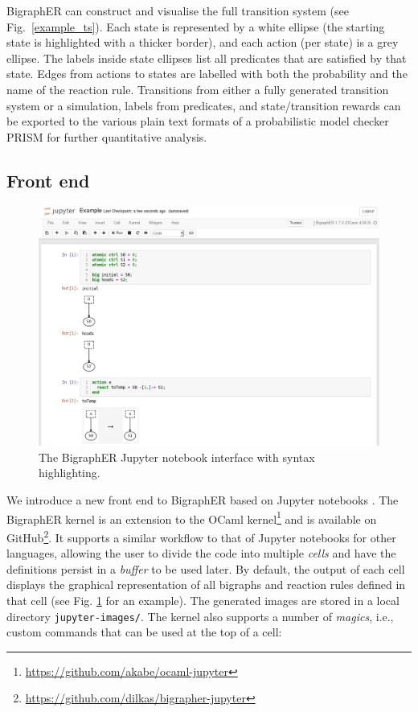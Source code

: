 \documentclass[runningheads]{llncs}
\begin{document}
BigraphER can construct and visualise the full transition system (see
Fig.~\ref{example_ts}). Each state is represented by a white ellipse (the
starting state is highlighted with a thicker border), and each action (per
state) is a grey ellipse. The labels inside state ellipses list all predicates
that are satisfied by that state. Edges from actions to states are labelled with
both the probability and the name of the reaction rule. Transitions from either
a fully generated transition system or a simulation, labels from predicates, and
state/transition rewards can be exported to the various plain text formats of a
probabilistic model checker PRISM \cite{DBLP:conf/cav/KwiatkowskaNP11} for
further quantitative analysis.

\subsection{Front end}

\begin{figure}
  \centering
  \includegraphics[width=\textwidth]{images/jupyter.jpg}
  \caption{The BigraphER Jupyter notebook interface with syntax highlighting.}
  \label{interface}
\end{figure}

We introduce a new front end to BigraphER based on Jupyter notebooks
\cite{DBLP:conf/elpub/KluyverRPGBFKHG16}. The BigraphER kernel is an extension
to the OCaml kernel\footnote{\url{https://github.com/akabe/ocaml-jupyter}} and
is available on
GitHub\footnote{\url{https://github.com/dilkas/bigrapher-jupyter}}. It supports
a similar workflow to that of Jupyter notebooks for other languages, allowing
the user to divide the code into multiple \emph{cells} and have the definitions
persist in a \emph{buffer} to be used later. By default, the output of each cell
displays the graphical representation of all bigraphs and reaction rules defined
in that cell (see Fig. \ref{interface} for an example). The generated images are
stored in a local directory \texttt{jupyter-images/}. The kernel also supports a
number of \emph{magics}, i.e., custom commands that can be used at the top of a
cell:
\end{document}
